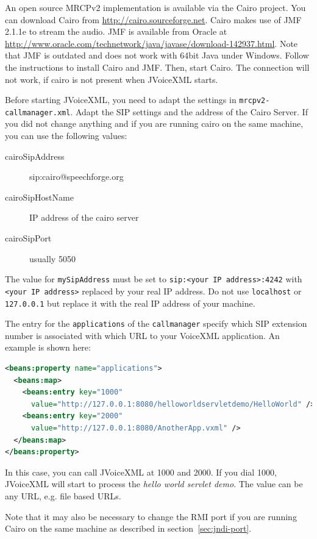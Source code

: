 \documentclass[11pt,a4paper]{book}
\begin{document}
An open source MRCPv2 implementation is available via the Cairo project. You can
download Cairo from \url{http://cairo.sourceforge.net}. Cairo makes use of JMF
2.1.1e to stream the audio. JMF is available from Oracle at
\url{http://www.oracle.com/technetwork/java/javase/download-142937.html}. Note
that JMF is outdated and does not work with 64bit Java under Windows.
Follow the instructions to install Cairo and JMF. Then, start Cairo. The
connection will not work, if cairo is not present when JVoiceXML starts. 

Before starting JVoiceXML, you need to adapt the settings in
\lstinline{mrcpv2-callmanager.xml}. Adapt the SIP settings and the address of
the Cairo Server. If you did not change anything and if you are running cairo
on the same machine, you can use the following values:
\begin{description}
\item[cairoSipAddress] sip:cairo@speechforge.org
\item[cairoSipHostName] IP address of the cairo server
\item[cairoSipPort] usually 5050
\end{description}

The value for \texttt{mySipAddress} must be set to \texttt{sip:<your IP
address>:4242} with \texttt{<your IP address>} replaced by your real IP address. 
Do not use \texttt{localhost} or 
\texttt{127.0.0.1} but replace it with the real IP address of your machine.

The entry for the \lstinline{applications} of the \lstinline{callmanager}
specify which SIP extension number is associated with which URL to your
VoiceXML application.
An example is shown here:
\begin{lstlisting}[language=XML]
<beans:property name="applications">
  <beans:map>
    <beans:entry key="1000"
      value="http://127.0.0.1:8080/helloworldservletdemo/HelloWorld" />
    <beans:entry key="2000"
      value="http://127.0.0.1:8080/AnotherApp.vxml" />
  </beans:map>
</beans:property>
\end{lstlisting}
In this case, you can call JVoiceXML at 1000 and 2000. If you dial 1000,
JVoiceXML will start to process the \emph{hello world servlet demo}. 
The value can be any URL, e.g. file based URLs.

Note that it may also be necessary to change the RMI port if you are running
Cairo on the same machine as described in section~\ref{sec:jndi-port}.
\end{document}
